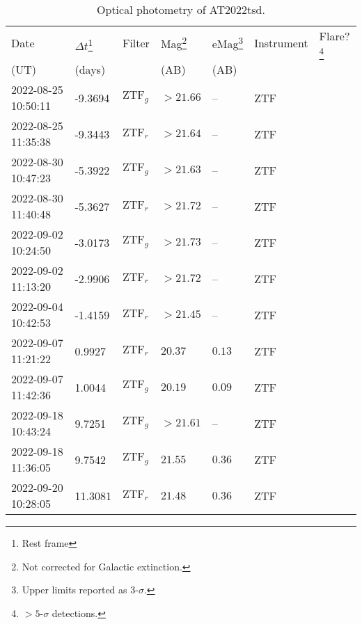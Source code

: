 \documentclass{nature_plusfigure}
\begin{document}
\clearpage

\begin{supplement}

\renewcommand{\thefigure}{Supplementary Information Figure~\arabic{figure}}
\renewcommand{\figurename}{}
\setcounter{figure}{0}
%


\renewcommand{\thetable}{Supplementary Information Table~\arabic{table}}
 \renewcommand{\tablename}{}
\setcounter{table}{0}

\begin{center} 
\begin{longtable}{lllllll} 
\caption{Optical photometry of AT2022tsd.} 
\label{tab:optical-photometry}\\ 
\hline\hline
Date & $\Delta t$\footnote{Rest frame} & Filter & Mag\footnote{Not corrected for Galactic extinction.} & eMag\footnote{Upper limits reported as 3-$\sigma$.} & Instrument & Flare?\footnote{$>5$-$\sigma$ detections.}\\ 
(UT) & (days) &  & (AB) & (AB) &  & \\ 
\hline
2022-08-25 10:50:11 & -9.3694 & $\mathrm{ZTF}_{g}$ & $>21.66$ & -- & ZTF &  \\ 
2022-08-25 11:35:38 & -9.3443 & $\mathrm{ZTF}_{r}$ & $>21.64$ & -- & ZTF &  \\ 
2022-08-30 10:47:23 & -5.3922 & $\mathrm{ZTF}_{g}$ & $>21.63$ & -- & ZTF &  \\ 
2022-08-30 11:40:48 & -5.3627 & $\mathrm{ZTF}_{r}$ & $>21.72$ & -- & ZTF &  \\ 
2022-09-02 10:24:50 & -3.0173 & $\mathrm{ZTF}_{g}$ & $>21.73$ & -- & ZTF &  \\ 
2022-09-02 11:13:20 & -2.9906 & $\mathrm{ZTF}_{r}$ & $>21.72$ & -- & ZTF &  \\ 
2022-09-04 10:42:53 & -1.4159 & $\mathrm{ZTF}_{r}$ & $>21.45$ & -- & ZTF &  \\ 
2022-09-07 11:21:22 & 0.9927 & $\mathrm{ZTF}_{r}$ & $20.37$ & $0.13$ & ZTF &  \\ 
2022-09-07 11:42:36 & 1.0044 & $\mathrm{ZTF}_{g}$ & $20.19$ & $0.09$ & ZTF &  \\ 
2022-09-18 10:43:24 & 9.7251 & $\mathrm{ZTF}_{g}$ & $>21.61$ & -- & ZTF &  \\ 
2022-09-18 11:36:05 & 9.7542 & $\mathrm{ZTF}_{g}$ & $21.55$ & $0.36$ & ZTF &  \\ 
2022-09-20 10:28:05 & 11.3081 & $\mathrm{ZTF}_{r}$ & $21.48$ & $0.36$ & ZTF &  \\ 

\end{longtable}
\end{center}
\end{supplement}
\end{document}
